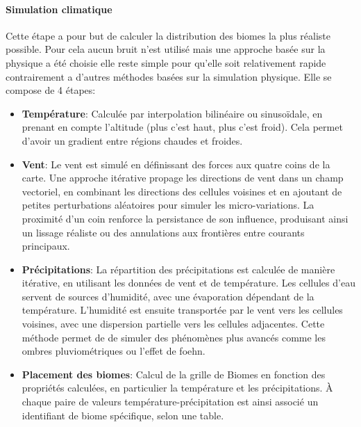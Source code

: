     \paragraph{Simulation climatique}
    Cette étape a pour but de calculer la distribution des biomes la plus réaliste possible. Pour cela aucun bruit n'est utilisé mais une approche basée sur la physique a été choisie elle reste simple pour qu'elle soit relativement rapide contrairement a d'autres méthodes basées sur la simulation physique. Elle se compose de 4 étapes:
    \begin{itemize}
        \item \textbf{Température}: Calculée par interpolation bilinéaire ou sinusoïdale, en prenant en compte l’altitude (plus c’est haut, plus c’est froid). Cela permet d'avoir un gradient entre régions chaudes et froides.
        
        \item \textbf{Vent}: Le vent est simulé en définissant des forces aux quatre coins de la carte. Une approche itérative propage les directions de vent dans un champ vectoriel, en combinant les directions des cellules voisines et en ajoutant de petites perturbations aléatoires pour simuler les micro-variations. La proximité d’un coin renforce la persistance de son influence, produisant ainsi un lissage réaliste ou des annulations aux frontières entre courants principaux.
        
        \item \textbf{Précipitations}: La répartition des précipitations est calculée de manière itérative, en utilisant les données de vent et de température. Les cellules d’eau servent de sources d’humidité, avec une évaporation dépendant de la température. L’humidité est ensuite transportée par le vent vers les cellules voisines, avec une dispersion partielle vers les cellules adjacentes. Cette méthode permet de de simuler des phénomènes plus avancés comme les ombres pluviométriques ou l'effet de foehn.

        \item \textbf{Placement des biomes}: Calcul de la grille de Biomes en fonction des propriétés calculées, en particulier la température et les précipitations. À chaque paire de valeurs température-précipitation est ainsi associé un identifiant de biome spécifique, selon une table.
    \end{itemize}
    
